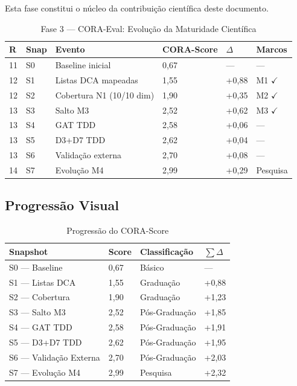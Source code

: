 \documentclass[12pt,a4paper,oneside]{article}
\begin{document}
Esta fase constitui o núcleo da contribuição científica deste documento.

\begin{table}[H]
\centering
\caption{Fase 3 — CORA-Eval: Evolução da Maturidade Científica}
\label{tab:fase3}
\begin{tabular}{p{}p{}p{}p{}p{}p{}}
\toprule
\textbf{R} & \textbf{Snap} & \textbf{Evento} & \textbf{CORA-Score} & $\Delta$ & \textbf{Marcos} \\
\midrule
11 & S0 & Baseline inicial & 0,67 & — & — \\
12 & S1 & Listas DCA mapeadas & 1,55 & +0,88 & M1 $\checkmark$ \\
12 & S2 & Cobertura N1 (10/10 dim) & 1,90 & +0,35 & M2 $\checkmark$ \\
13 & S3 & Salto M3 & 2,52 & +0,62 & M3 $\checkmark$ \\
13 & S4 & GAT TDD & 2,58 & +0,06 & — \\
13 & S5 & D3+D7 TDD & 2,62 & +0,04 & — \\
13 & S6 & Validação externa & 2,70 & +0,08 & — \\
14 & S7 & Evolução M4 & 2,99 & +0,29 & Pesquisa \\
\bottomrule
\end{tabular}
\end{table}

\subsection{Progressão Visual}

\begin{table}[H]
\centering
\caption{Progressão do CORA-Score}
\label{tab:progressao}
\begin{tabular}{p{}p{}p{}p{}}
\toprule
\textbf{Snapshot} & \textbf{Score} & \textbf{Classificação} & $\sum\Delta$ \\
\midrule
S0 — Baseline & 0,67 & Básico & — \\
S1 — Listas DCA & 1,55 & Graduação & +0,88 \\
S2 — Cobertura & 1,90 & Graduação & +1,23 \\
S3 — Salto M3 & 2,52 & Pós-Graduação & +1,85 \\
S4 — GAT TDD & 2,58 & Pós-Graduação & +1,91 \\
S5 — D3+D7 TDD & 2,62 & Pós-Graduação & +1,95 \\
S6 — Validação Externa & 2,70 & Pós-Graduação & +2,03 \\
S7 — Evolução M4 & 2,99 & Pesquisa & +2,32 \\
\bottomrule
\end{tabular}
\end{table}
\end{document}

